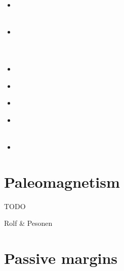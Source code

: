 \begin{scriptsize}
\begin{itemize}
\textcite{nacl09}\\
\textcite{kalb09}\\
\item[\twothousandten] 
\textcite{bepo10}\\
\textcite{yosh10}\\
\item[\twothousandtwelve] 
\textcite{nalr12}\\
\textcite{ghho12}\\
\textcite{wagw12}\\
\item[\twothousandthirteen] 
\textcite{ghhw13}\\
\item[\twothousandfourteen] 
\textcite{vagw14}\\
\item[\twothousandseventeen] 
\textcite{grrb17}\\
\item[\twothousandeighteen] 
\textcite{osss18} \\
\textcite{magu18}\\
\item[\twothousandnineteen] 
\textcite{tamg19}\\
\end{itemize}
\end{scriptsize}


\section{Paleomagnetism} 

TODO

Rolf \& Pesonen \cite{rope18}



\section{Passive margins} 


